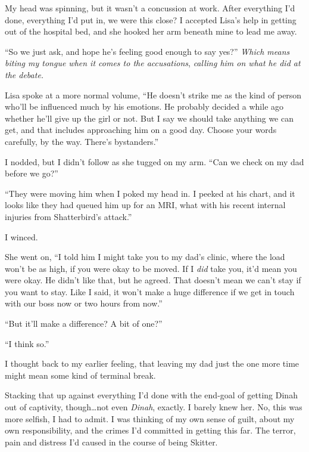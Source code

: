 My head was spinning, but it wasn't a concussion at work.  After everything I'd done, everything I'd put in, we were this close?  I accepted Lisa's help in getting out of the hospital bed, and she hooked her arm beneath mine to lead me away.



``So we just ask, and hope he's feeling good enough to say yes?''  \emph{Which means biting my tongue when it comes to the accusations}, \emph{calling him on what he did at the debate.}



Lisa spoke at a more normal volume, ``He doesn't strike me as the kind of person who'll be influenced much by his emotions.  He probably decided a while ago whether he'll give up the girl or not.  But I say we should take anything we can get, and that includes approaching him on a good day.  Choose your words carefully, by the way.  There's bystanders.''



I nodded, but I didn't follow as she tugged on my arm.  ``Can we check on my dad before we go?''



``They were moving him when I poked my head in.  I peeked at his chart, and it looks like they had queued him up for an MRI, what with his recent internal injuries from Shatterbird's attack.''



I winced.



She went on, ``I told him I might take you to my dad's clinic, where the load won't be as high, if you were okay to be moved.  If I \emph{did} take you,\emph{ }it'd mean you were okay.  He didn't like that, but he agreed.  That doesn't mean we can't stay if you want to stay.  Like I said, it won't make a huge difference if we get in touch with our boss now or two hours from now.''



``But it'll make a difference?  A bit of one?''



``I think so.''



I thought back to my earlier feeling, that leaving my dad just the one more time might mean some kind of terminal break.



Stacking that up against everything I'd done with the end-goal of getting Dinah out of captivity, though\ldots not even \emph{Dinah}, exactly.  I barely knew her.  No, this was more selfish, I had to admit.  I was thinking of my own sense of guilt, about my own responsibility, and the crimes I'd committed in getting this far.  The terror, pain and distress I'd caused in the course of being Skitter.



